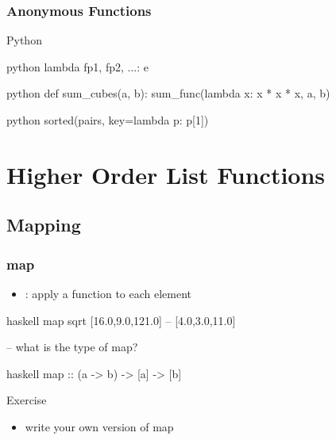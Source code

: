 \documentclass[dvipsnames]{beamer}
\theoremstyle{plain}
\begin{document}
\begin{frame}[fragile]
  \frametitle{Anonymous Functions}

  \begin{block}{Python}
    \begin{pygments}{python}
      lambda fp1, fp2, ...: e
    \end{pygments}
  \end{block}

  \medskip
  \begin{example}{}
    \begin{pygments}{python}
def sum_cubes(a, b):
    sum_func(lambda x: x * x * x, a, b)
    \end{pygments}

    \pause
    \bigskip
    \begin{pygments}{python}
sorted(pairs, key=lambda p: p[1])
    \end{pygments}
  \end{example}
\end{frame}

\section{Higher Order List Functions}

\subsection{Mapping}

\begin{frame}[fragile]
  \frametitle{map}

  \begin{itemize}
    \item {}: apply a function to each element
  \end{itemize}

  \pause
  \begin{example}[Haskell]
    \begin{pygments}{haskell}
map sqrt [16.0,9.0,121.0]     -- [4.0,3.0,11.0]

-- what is the type of map?
    \end{pygments}

    \pause
    \begin{pygments}{haskell}
map :: (a -> b) -> [a] -> [b]
    \end{pygments}
  \end{example}

  \pause
  \begin{block}{Exercise}
    \begin{itemize}
      \item write your own version of map
    \end{itemize}
  \end{block}
\end{frame}
\end{document}
